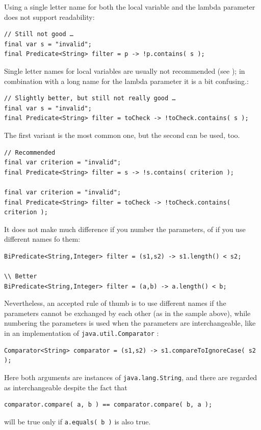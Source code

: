 Using a single letter name for both the local variable and the lambda parameter does not support readability:
\begin{lstlisting}
// Still not good …
final var s = "invalid";
final Predicate<String> filter = p -> !p.contains( s );
\end{lstlisting}

Single letter names for local variables are usually not recommended (see ); in combination with a long name for the lambda parameter it is a bit confusing.:
\begin{lstlisting}
// Slightly better, but still not really good …
final var s = "invalid";
final Predicate<String> filter = toCheck -> !toCheck.contains( s );
\end{lstlisting}

The first variant is the most common one, but the second can be used, too.
\begin{lstlisting}
// Recommended
final var criterion = "invalid";
final Predicate<String> filter = s -> !s.contains( criterion );

final var criterion = "invalid";
final Predicate<String> filter = toCheck -> !toCheck.contains( criterion );
\end{lstlisting}

It does not make much difference if you number the parameters, of if you use different names fo them:
\begin{lstlisting}
BiPredicate<String,Integer> filter = (s1,s2) -> s1.length() < s2;

\\ Better
BiPredicate<String,Integer> filter = (a,b) -> a.length() < b;
\end{lstlisting}

Nevertheless, an accepted rule of thumb is to use different names if the parameters cannot be exchanged by each other (as in the sample above), while numbering the parameters is used when the parameters are interchangeable, like in an implementation of \lstinline|java.util.Comparator| \autocite{ORACLE_DOC_COMPARATOR_INTERFACE}:
\begin{lstlisting}
Comparator<String> comparator = (s1,s2) -> s1.compareToIgnoreCase( s2 );
\end{lstlisting}
Here both arguments are instances of \lstinline|java.lang.String|, and there are regarded as interchangeable despite the fact that
\begin{lstlisting}
comparator.compare( a, b ) == comparator.compare( b, a );
\end{lstlisting}
will be true only if \lstinline|a.equals( b )| is also true.

